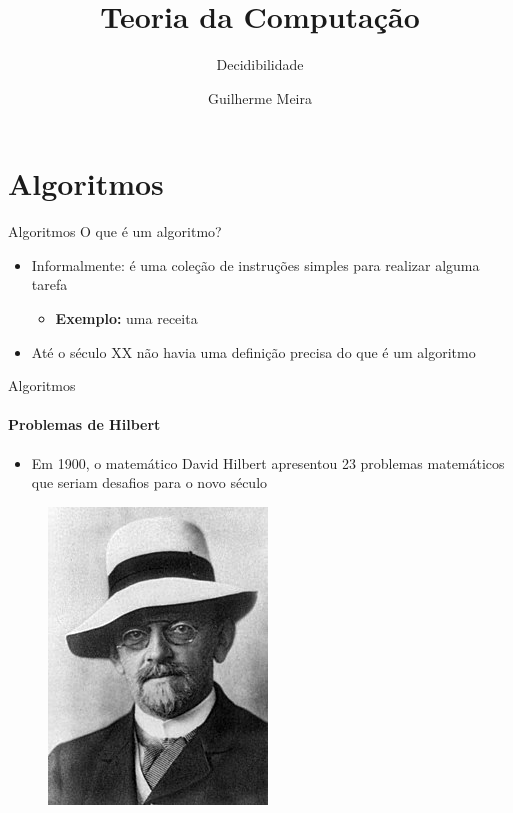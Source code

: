 \documentclass{beamer}
\title{Teoria da Computação} %
\subtitle{Decidibilidade} %
\author{Guilherme Meira}
\begin{document}
  \frame{\maketitle}
  	
\section{Algoritmos}
\begin{frame}{Algoritmos}
	O que é um algoritmo?\pause
	\begin{itemize}
		\item Informalmente: é uma coleção de instruções simples para realizar alguma tarefa
		\begin{itemize}
			\item \textbf{Exemplo:} uma receita
		\end{itemize}
		\item Até o século XX não havia uma definição precisa do que é um algoritmo
	\end{itemize}
\end{frame}
\begin{frame}{Algoritmos}
	\framesubtitle{Problemas de Hilbert}
	\begin{itemize}
		\item Em 1900, o matemático David Hilbert apresentou 23 problemas matemáticos que seriam desafios para o novo século
	\end{itemize}
	\begin{figure}
		\includegraphics[width=0.3\paperwidth]{resources/hilbert}
	\end{figure}
\end{frame}
\end{document}
